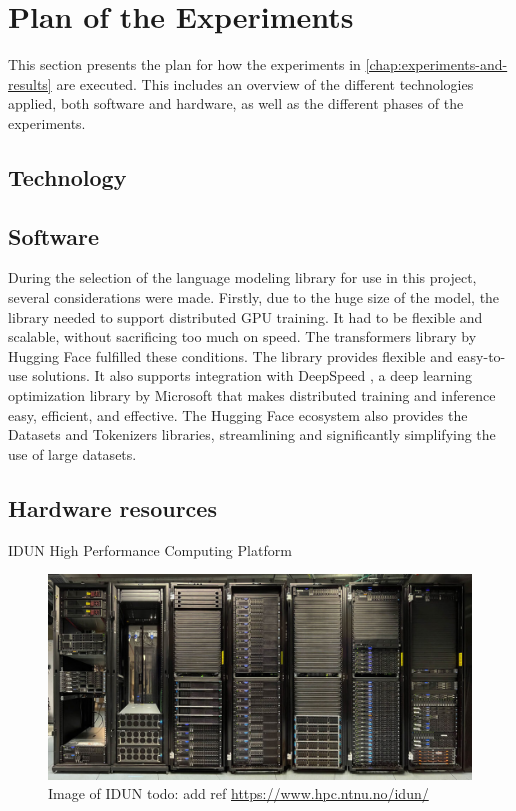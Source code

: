 \section{Plan of the Experiments}
This section presents the plan for how the experiments in \cref{chap:experiments-and-results} are executed. This includes an overview of the different technologies applied, both software and hardware, as well as the different phases of the experiments.

\subsection{Technology}
\label{sec:technology}

\subsection{Software}
\label{sec:software}
During the selection of the language modeling library for use in this project, several considerations were made. Firstly, due to the huge size of the model, the library needed to support distributed GPU training. It had to be flexible and scalable, without sacrificing too much on speed. The transformers \cite{transformers} library by Hugging Face \cite{hugging-face} fulfilled these conditions. The library provides flexible and easy-to-use solutions. It also supports integration with DeepSpeed \cite{deepspeed}, a deep learning optimization library by Microsoft \cite{microsoft} that makes distributed training and inference easy, efficient, and effective. The Hugging Face ecosystem also provides the Datasets and Tokenizers libraries, streamlining and significantly simplifying the use of large datasets.

\subsection{Hardware resources}
\label{sec:hardware-resources}

IDUN High Performance Computing Platform

\begin{figure}[htp]
    \centering
    \includegraphics[width=\textwidth]{figures/idun.jpeg}
    \caption{Image of IDUN todo: add ref \url{https://www.hpc.ntnu.no/idun/}}
    \label{fig:flowchart}
\end{figure}

